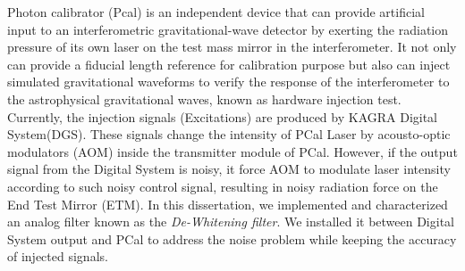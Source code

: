 Photon calibrator (Pcal) is an independent device that can provide artificial input to an interferometric gravitational-wave detector by exerting the radiation pressure of its own laser on the test mass mirror in the interferometer. It not only can provide a fiducial length reference for calibration purpose but also can inject simulated gravitational waveforms to verify the response of the interferometer to the astrophysical gravitational waves, known as hardware injection test. 
Currently, the injection signals (Excitations) are produced by KAGRA Digital System(DGS). These signals change the intensity of PCal Laser by acousto-optic modulators (AOM) inside the transmitter module of PCal. However, if the output signal from the Digital System is noisy, it force AOM to modulate laser intensity according to such noisy control signal, resulting in noisy radiation force on the End Test Mirror (ETM). In this dissertation, we implemented and characterized an analog filter known as the \emph{De-Whitening filter}. We installed it between Digital System output and PCal to address the noise problem while keeping the accuracy of injected signals.

%
%
%
%
%
